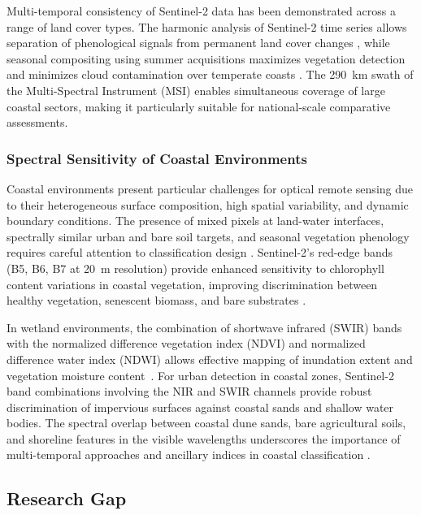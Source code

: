 \documentclass[coasts,article,accept,pdftex,moreauthors]{Definitions/mdpi}
\begin{document}
Multi-temporal consistency of Sentinel-2 data has been demonstrated across a range of land cover types. The harmonic analysis of Sentinel-2 time series allows separation of phenological signals from permanent land cover changes \citep{jamet2019harmonic}, while seasonal compositing using summer acquisitions maximizes vegetation detection and minimizes cloud contamination over temperate coasts \citep{RF_Czechia2022,Lemenkova202401,inglada2017sits}. The 290~km swath of the Multi-Spectral Instrument (MSI) enables simultaneous coverage of large coastal sectors, making it particularly suitable for national-scale comparative assessments.

\subsubsection{Spectral Sensitivity of Coastal Environments}

Coastal environments present particular challenges for optical remote sensing due to their heterogeneous surface composition, high spatial variability, and dynamic boundary conditions. The presence of mixed pixels at land-water interfaces, spectrally similar urban and bare soil targets, and seasonal vegetation phenology requires careful attention to classification design \citep{earth5030024}. Sentinel-2's red-edge bands (B5, B6, B7 at 20~m resolution) provide enhanced sensitivity to chlorophyll content variations in coastal vegetation, improving discrimination between healthy vegetation, senescent biomass, and bare substrates \citep{Mercieretal2019,doNascimentoBendinietal2024}.

In wetland environments, the combination of shortwave infrared (SWIR) bands with the normalized difference vegetation index (NDVI) and normalized difference water index (NDWI) allows effective mapping of inundation extent and vegetation moisture content~\mbox{\citep{gaudart2021zones,jmse12050709,berhault2020sentinel}}. For urban detection in coastal zones, Sentinel-2 band combinations involving the NIR and SWIR channels provide robust discrimination of impervious surfaces against coastal sands and shallow water bodies. The spectral overlap between coastal dune sands, bare agricultural soils, and shoreline features in the visible wavelengths underscores the importance of multi-temporal approaches and ancillary indices in coastal classification \citep{Gatis2022}.

\subsection{Research Gap}
\end{document}
